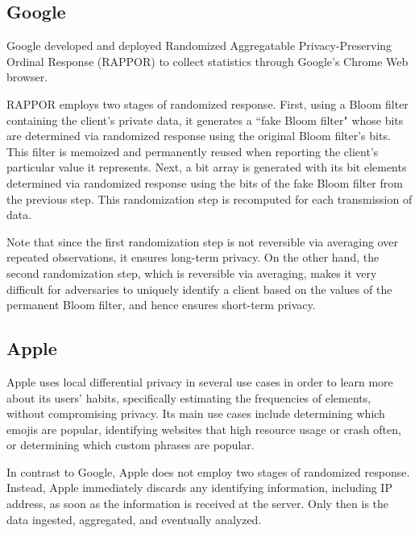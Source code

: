 \documentclass[12pt]{article}
\theoremstyle{definition}
\begin{document}
\subsection{Google}

\noindent

Google developed and deployed Randomized Aggregatable Privacy-Preserving Ordinal Response (RAPPOR) to collect statistics through Google's Chrome Web browser.

\bigskip

RAPPOR employs two stages of randomized response. First, using a Bloom filter containing the client's private data, it generates a ``fake Bloom filter" whose bits are determined via randomized response using the original Bloom filter's bits. This filter is memoized and permanently reused when reporting the client's particular value it represents. Next, a bit array is generated with its bit elements determined via randomized response using the bits of the fake Bloom filter from the previous step. This randomization step is recomputed for each transmission of data.

\bigskip

Note that since the first randomization step is not reversible via averaging over repeated observations, it ensures long-term privacy. On the other hand, the second randomization step, which is reversible via averaging, makes it very difficult for adversaries to uniquely identify a client based on the values of the permanent Bloom filter, and hence ensures short-term privacy.

\subsection{Apple}

\noindent

Apple uses local differential privacy in several use cases in order to learn more about its users' habits, specifically estimating the frequencies of elements, without compromising privacy. Its main use cases include determining which emojis are popular, identifying websites that high resource usage or crash often, or determining which custom phrases are popular.

\bigskip

In contrast to Google, Apple does not employ two stages of randomized response. Instead, Apple immediately discards any identifying information, including IP address, as soon as the information is received at the server. Only then is the data ingested, aggregated, and eventually analyzed.
\end{document}
